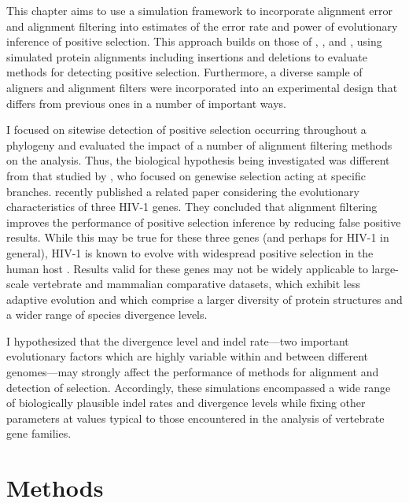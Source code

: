 This chapter aims to use a simulation framework to incorporate
alignment error and alignment filtering into estimates of the error
rate and power of \sw evolutionary inference of positive
selection. This approach builds on those of \citet{Anisimova2002},
\citet{Fletcher2010}, and \citet{Privman2011Improving}, using
simulated protein alignments including insertions and deletions to
evaluate methods for detecting \sw positive selection. Furthermore, a
diverse sample of aligners and alignment filters were incorporated
into an experimental design that differs from previous ones in a
number of important ways.

I focused on sitewise detection of positive selection occurring
throughout a phylogeny and evaluated the impact of a number of
alignment filtering methods on the \sw analysis. Thus, the biological
hypothesis being investigated was different from that studied by
\citet{Fletcher2010}, who focused on genewise selection acting at
specific branches.  \citet{Privman2011Improving} recently published a
related paper considering the evolutionary characteristics of three
HIV-1 genes. They concluded that alignment filtering improves the
performance of positive selection inference by reducing false positive
results. While this may be true for these three genes (and perhaps for
HIV-1 in general), HIV-1 is known to evolve with widespread positive
selection in the human host \citep{Yang2003Widespread}. Results valid
for these genes may not be widely applicable to large-scale vertebrate
and mammalian comparative datasets, which exhibit less adaptive
evolution \citep{Kosiol2008} and which comprise a larger diversity of
protein structures and a wider range of species divergence levels.

I hypothesized that the divergence level and indel rate---two important
evolutionary factors which are highly variable within and between
different genomes---may strongly affect the performance of methods for
alignment and detection of selection. Accordingly, these simulations
encompassed a wide range of biologically plausible indel rates and
divergence levels while fixing other parameters at values typical to
those encountered in the \sw analysis of vertebrate gene families.

\section{Methods}


